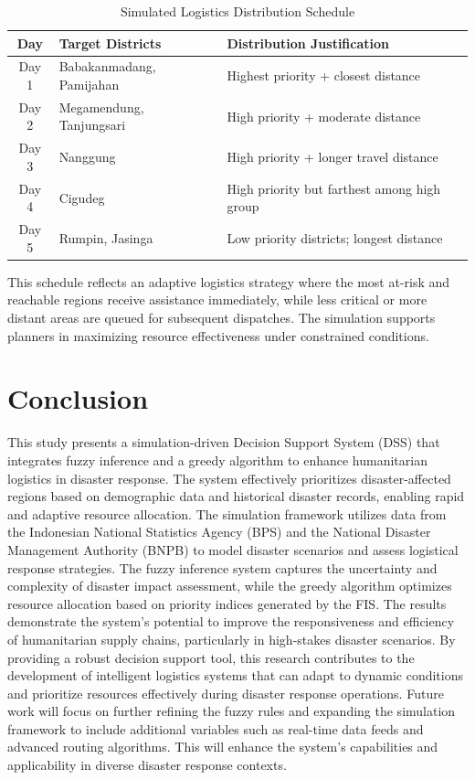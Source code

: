 \documentclass[journal,final,a4paper,twoside,11pt]{IEEEtran}
\begin{document}
\begin{table}[H]
\caption{Simulated Logistics Distribution Schedule}
\begin{center}
\begin{tabular}{|c|p{2cm}|p{3.5cm}|}
\hline
\textbf{Day} & \textbf{Target Districts} & \textbf{Distribution Justification} \\
\hline
Day 1 & Babakanmadang, Pamijahan & Highest priority + closest distance \\
\hline
Day 2 & Megamendung, Tanjungsari & High priority + moderate distance \\
\hline
Day 3 & Nanggung & High priority + longer travel distance \\
\hline
Day 4 & Cigudeg & High priority but farthest among high group \\
\hline
Day 5 & Rumpin, Jasinga & Low priority districts; longest distance \\
\hline
\end{tabular}
\label{tab:distribution_schedule}
\end{center}
\end{table}


This schedule reflects an adaptive logistics strategy where the most at-risk and reachable regions receive assistance immediately, while less critical or more distant areas are queued for subsequent dispatches. The simulation supports planners in maximizing resource effectiveness under constrained conditions.




\section{Conclusion}
This study presents a simulation-driven Decision Support System (DSS) that integrates fuzzy inference and a greedy algorithm to enhance humanitarian logistics in disaster response. The system effectively prioritizes disaster-affected regions based on demographic data and historical disaster records, enabling rapid and adaptive resource allocation.
The simulation framework utilizes data from the Indonesian National Statistics Agency (BPS) and the National Disaster Management Authority (BNPB) to model disaster scenarios and assess logistical response strategies. The fuzzy inference system captures the uncertainty and complexity of disaster impact assessment, while the greedy algorithm optimizes resource allocation based on priority indices generated by the FIS.
The results demonstrate the system's potential to improve the responsiveness and efficiency of humanitarian supply chains, particularly in high-stakes disaster scenarios. By providing a robust decision support tool, this research contributes to the development of intelligent logistics systems that can adapt to dynamic conditions and prioritize resources effectively during disaster response operations. Future work will focus on further refining the fuzzy rules and expanding the simulation framework to include additional variables such as real-time data feeds and advanced routing algorithms. This will enhance the system's capabilities and applicability in diverse disaster response contexts.
\end{document}
